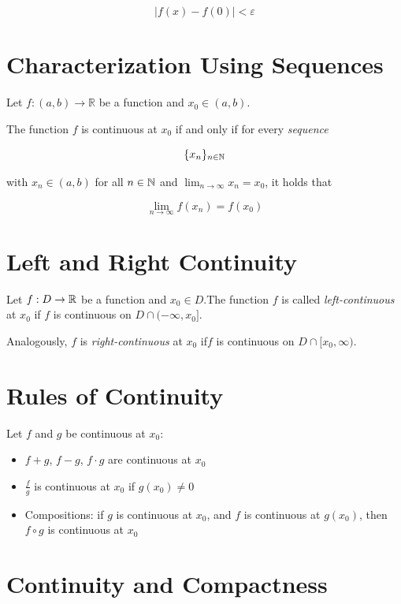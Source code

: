 \[
    |f(x) - f(0)| < \varepsilon
\]

\QED

\section{Characterization Using Sequences}

Let \(f : (a,b) \to \mathbb{R}\) be a function and \(x_0 \in (a,b)\).

The function \(f\) is continuous at \(x_0\) if and only if for every \emph{sequence} 

\[
    \{x_n\}_{n\in \mathbb{N}}
\] 

with \(x_n \in (a,b)\) for all \(n \in \mathbb{N}\) and \(\lim_{n\to\infty} x_n = x_0\), it holds that 

\[
    \lim_{n\to\infty} f(x_n) = f(x_0)
\]

\section{Left and Right Continuity}

Let \( f : D \to \mathbb{R} \) be a function and \( x_0 \in D \).The function \( f \) is called \emph{left-continuous} at \( x_0 \) if
\( f \) is continuous on \( D \cap (-\infty, x_0] \).

Analogously, \( f \) is \emph{right-continuous} at \( x_0 \) if\( f \) is continuous on \( D \cap [x_0, \infty) \).

\section{Rules of Continuity}

Let \(f\) and \(g\) be continuous at \(x_0\):

\begin{itemize}
    
    \item \(f + g\), \(f - g\), \(f \cdot g\) are continuous at \(x_0\)
    
    \item \(\frac{f}{g}\) is continuous at \(x_0\) if \(g(x_0) \ne 0\)
    
    \item Compositions: if \(g\) is continuous at \(x_0\), and \(f\) is continuous at \(g(x_0)\), 
    then \(f \circ g\) is continuous at \(x_0\)

\end{itemize}

\section{Continuity and Compactness}

